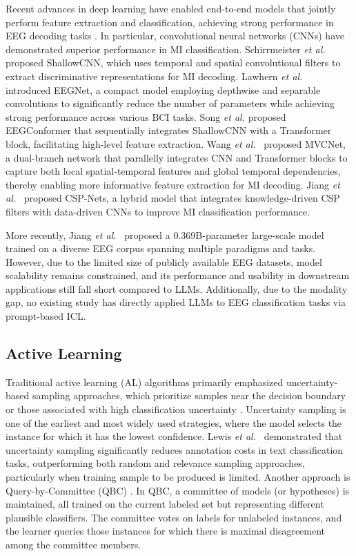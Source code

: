 \documentclass[journal,twocolumn]{IEEEtran}
\begin{document}
Recent advances in deep learning have enabled end-to-end models that jointly perform feature extraction and classification, achieving strong performance in EEG decoding tasks \cite{craik2019deep, shoeibi2021epileptic}. In particular, convolutional neural networks (CNNs) have demonstrated superior performance in MI classification. Schirrmeister \textit{et al.}~\cite{schirrmeister2017deep} proposed ShallowCNN, which uses temporal and spatial convolutional filters to extract discriminative representations for MI decoding. Lawhern \textit{et al.}~\cite{EEGNet} introduced EEGNet, a compact model employing depthwise and separable convolutions to significantly reduce the number of parameters while achieving strong performance across various BCI tasks. Song \textit{et al.} \cite{song2022conformer} proposed EEGConformer that sequentially integrates ShallowCNN with a Transformer block, facilitating high-level feature extraction. Wang \textit{et al.}~\cite{wang2025mvcnet} proposed MVCNet, a dual-branch network that parallelly integrates CNN and Transformer blocks to capture both local spatial-temporal features and global temporal dependencies, thereby enabling more informative feature extraction for MI decoding. Jiang \textit{et al.}~\cite{jiang2024csp} proposed CSP-Nets, a hybrid model that integrates knowledge-driven CSP filters with data-driven CNNs to improve MI classification performance.

More recently, Jiang \textit{et al.}~\cite{jiang2024large} proposed a 0.369B-parameter large-scale model trained on a diverse EEG corpus spanning multiple paradigms and tasks. However, due to the limited size of publicly available EEG datasets, model scalability remains constrained, and its performance and usability in downstream applications still fall short compared to LLMs. Additionally, due to the modality gap, no existing study has directly applied LLMs to EEG classification tasks via prompt-based ICL.

\subsection{Active Learning}

Traditional active learning (AL) algorithms primarily emphasized uncertainty-based sampling approaches, which prioritize samples near the decision boundary or those associated with high classification uncertainty \cite{Settles2009}. Uncertainty sampling is one of the earliest and most widely used strategies, where the model selects the instance for which it has the lowest confidence. Lewis \textit{et al.}~\cite{lewis1995sequential} demonstrated that uncertainty sampling significantly reduces annotation costs in text classification tasks, outperforming both random and relevance sampling approaches, particularly when training sample to be produced is limited. Another approach is Query-by-Committee (QBC) \cite{Seung1992}. In QBC, a committee of models (or hypotheses) is maintained, all trained on the current labeled set but representing different plausible classifiers. The committee votes on labels for unlabeled instances, and the learner queries those instances for which there is maximal disagreement among the committee members.
\end{document}
